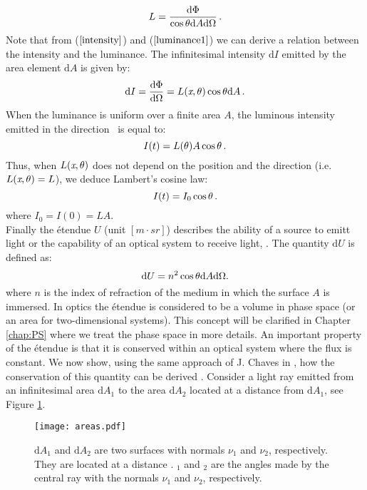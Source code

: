 \begin{equation}\label{luminance1}
  L=\frac{\textrm{d}\Phi}{\cos\mbox{$\theta$}\textrm{d}A\textrm{d}\Omega}\,.
\end{equation}
\noindent Note that from ($\ref{intensity}$) and ($\ref{luminance1}$) we can derive a relation between the intensity and the luminance. The infinitesimal intensity $\textrm{d}I $ emitted by the area element $\textrm{d}A$ is given by:
\begin{equation}
\textrm{d}I = \frac{\textrm{d}\Phi}{\textrm{d}\Omega}= L(\textit{x},\mbox{$\theta$})\cos\mbox{$\theta$}\textrm{d}A \,.
\end{equation}
When the luminance is uniform over a finite area $A$, the luminous intensity emitted in the direction \myangle $\,$ is equal to:
\begin{equation}
I(t) = L(\mbox{$\theta$}) A \cos\mbox{$\theta$}\,.
\end{equation}
Thus, when $L(\textit{x},\mbox{$\theta$})$ does not depend on the position and the direction (i.e. $L(\textit{x},\mbox{$\theta$})=L$), we deduce Lambert's cosine law:
\begin{equation}
I(t) = I_0\cos\mbox{$\theta$}\,.
\end{equation}
where $I_0 = I(0) = LA$. \\
Finally the \'{e}tendue $U$ (unit $[m \cdot sr]$) describes the ability of a source to emitt light or the capability of an optical system to receive light, \cite{zhu2011etendue}.
The quantity $ \textrm{d}U $ is defined as:
\begin{equation}\label{etendue}
\textrm{d}U = n^2 \cos\mbox{$\theta$}\textrm{d}A\textrm{d}\Omega.
\end{equation}
where $n$ is the index of refraction of the medium in which the surface $A$ is immersed. In optics the \'{e}tendue is considered to be a volume in phase space  (or an area for two-dimensional systems). This concept will be clarified in Chapter \ref{chap:PS} where we treat the phase space in more details.
An important property of the \'{e}tendue is that it is conserved within an optical system where the flux is constant. We now show, using the same approach of J. Chaves in \cite{chaves2015introduction}, how the conservation of this quantity can be derived .
Consider a light ray emitted from an infinitesimal area $\textrm{d}A_1$ to the area $\textrm{d}A_2$ located at a distance  from $\textrm{d}A_1$,  see Figure \ref{fig:etendue_conservation}.
\begin{figure}[h]
 \label{fig:etendue_conservation}
     \begin{center}
     \texttt{[image: areas.pdf]}
     \end{center}
     \caption{\footnotesize{$\textrm{d}A_1$ and $\textrm{d}A_2$ are two surfaces with normals $\nu_1$ and $\nu_2$, respectively. They are located at a distance .
\myangle$_1$ and \myangle$_2$ are the angles made by the central ray with the normals $\nu_1$ and $\nu_2$, respectively.}}
\label{fig:etendue_conservation}
 \end{figure}
